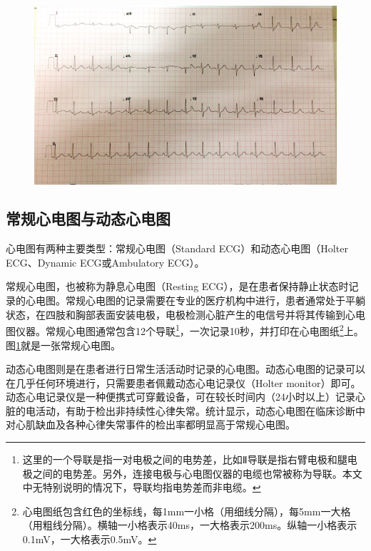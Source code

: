 \begin{figure}
    \centering
    \includegraphics[width=.63\textwidth]{../assets/10sec-ekg-lead}
    \label{fig:10sec-ekg-lead}
\end{figure}

\subsection{常规心电图与动态心电图}\label{subsec:standard-holter}

心电图有两种主要类型：常规心电图（Standard ECG）和动态心电图（Holter ECG、Dynamic ECG或Ambulatory ECG）。

常规心电图，也被称为静息心电图（Resting ECG），是在患者保持静止状态时记录的心电图。常规心电图的记录需要在专业的医疗机构中进行，患者通常处于平躺状态，在四肢和胸部表面安装电极，电极检测心脏产生的电信号并将其传输到心电图仪器。常规心电图通常包含12个导联\footnote{这里的一个导联是指一对电极之间的电势差，比如Ⅱ导联是指右臂电极和腿电极之间的电势差。另外，连接电极与心电图仪器的电缆也常被称为导联。本文中无特别说明的情况下，导联均指电势差而非电缆。}，一次记录10秒，并打印在心电图纸\footnote{心电图纸包含红色的坐标线，每1mm一小格（用细线分隔），每5mm一大格（用粗线分隔）。横轴一小格表示40ms，一大格表示200ms。纵轴一小格表示0.1mV，一大格表示0.5mV。}上。图\ref{fig:10sec-ekg-lead}就是一张常规心电图。

动态心电图则是在患者进行日常生活活动时记录的心电图。动态心电图的记录可以在几乎任何环境进行，只需要患者佩戴动态心电记录仪（Holter monitor）即可。动态心电记录仪是一种便携式可穿戴设备，可在较长时间内（24小时以上）记录心脏的电活动，有助于检出非持续性心律失常。统计显示，动态心电图在临床诊断中对心肌缺血及各种心律失常事件的检出率都明显高于常规心电图\cite{zhengDongtaixindiantuyuchangguixindiantuzhenduanguanxinbinghuanzhexinjiquexiejixinlushichangdelinchuangxiaoguobijiao2011}。

